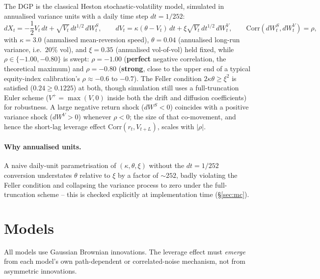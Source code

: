 \documentclass[11pt,a4paper]{article}
\begin{document}
The DGP is the classical Heston stochastic-volatility model, simulated
in annualised variance units with a daily time step $dt=1/252$:
\begin{equation}
  dX_t = -\frac{1}{2}V_t\,dt + \sqrt{V_t}\,dt^{1/2}\,dW_t^S,
  \qquad
  dV_t = \kappa(\theta-V_t)\,dt + \xi\sqrt{V_t}\,dt^{1/2}\,dW_t^V,
  \qquad
  \mathrm{Corr}(dW_t^S,dW_t^V)=\rho,
  \label{eq:heston}
\end{equation}
with $\kappa=3.0$ (annualised mean-reversion speed), $\theta=0.04$
(annualised long-run variance, i.e.\ $20\%$ vol), and $\xi=0.35$
(annualised vol-of-vol) held fixed, while $\rho\in\{-1.00,-0.80\}$ is
swept: $\rho=-1.00$ (\textbf{perfect} negative correlation, the
theoretical maximum) and $\rho=-0.80$ (\textbf{strong}, close to the
upper end of a typical equity-index calibration's $\rho\approx-0.6$ to
$-0.7$). The Feller condition $2\kappa\theta\geq\xi^2$ is satisfied
($0.24\geq0.1225$) at both, though simulation still uses a
full-truncation Euler scheme ($V^+=\max(V,0)$ inside both the drift
and diffusion coefficients) for robustness. A large negative return
shock ($dW^S<0$) coincides with a positive variance shock ($dW^V>0$)
whenever $\rho<0$; the size of that co-movement, and hence the
short-lag leverage effect $\mathrm{Corr}(r_t,V_{t+L})$, scales with
$|\rho|$.

\paragraph{Why annualised units.} A naive daily-unit parametrisation
of $(\kappa,\theta,\xi)$ without the $dt=1/252$ conversion understates
$\theta$ relative to $\xi$ by a factor of $\sim252$, badly violating
the Feller condition and collapsing the variance process to zero under
the full-truncation scheme -- this is checked explicitly at
implementation time (\S\ref{sec:mc}).

\section{Models}

All models use Gaussian Brownian innovations. The leverage effect must
\emph{emerge} from each model's own path-dependent or correlated-noise
mechanism, not from asymmetric innovations.
\end{document}

